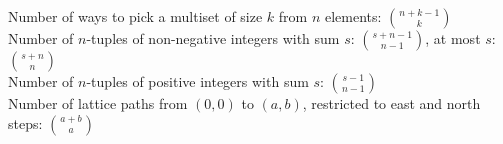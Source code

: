 \documentclass[12pt]{extarticle}
\begin{document}
\begin{multicols*}{2}
\iffalse
\begin{tabular}{r|rrrrrrrrrrrrr}
    & $0$ & $1$ & $2$ & $3$ & $4$ & $5$ & $6$ & $7$ & $8$ & $9$ & $10$ & $11$ & $12$ \\
    \hline
    $0$ & $1$\\
    $1$ & $1$ & $1$\\
    $2$ & $1$ & $2$ & $1$\\
    $3$ & $1$ & $3$ & $3$ & $1$\\
    $4$ & $1$ & $4$ & $6$ & $4$ & $1$\\
    $5$ & $1$ & $5$ & $10$ & $10$ & $5$ & $1$\\
    $6$ & $1$ & $6$ & $15$ & $20$ & $15$ & $6$ & $1$\\
    $7$ & $1$ & $7$ & $21$ & $35$ & $35$ & $21$ & $7$ & $1$\\
    $8$ & $1$ & $8$ & $28$ & $56$ & $70$ & $56$ & $28$ & $8$ & $1$\\
    $9$ & $1$ & $9$ & $36$ & $84$ & $126$ & $126$ & $84$ & $36$ & $9$ & $1$\\
    $10$ & $1$ & $10$ & $45$ & $120$ & $210$ & $252$ & $210$ & $120$ & $45$ & $10$ & $1$\\
    $11$ & $1$ & $11$ & $55$ & $165$ & $330$ & $462$ & $462$ & $330$ & $165$ & $55$ & $11$ & $1$\\
    $12$ & $1$ & $12$ & $66$ & $220$ & $495$ & $792$ & $924$ & $792$ & $495$ & $220$ & $66$ & $12$ & $1$ \\
    \hline
    & $0$ & $1$ & $2$ & $3$ & $4$ & $5$ & $6$ & $7$ & $8$ & $9$ & $10$ & $11$ & $12$
\end{tabular}
\fi

Number of ways to pick a multiset of size $k$ from $n$ elements: ${n+k-1 \choose k}$ \\
Number of $n$-tuples of non-negative integers with sum $s$:
${{s+n-1} \choose {n-1}}$, at most $s$: ${{s + n} \choose {n}}$ \\
Number of $n$-tuples of positive integers with sum $s$:
${{s-1} \choose {n-1}}$ \\
Number of lattice paths from $(0,0)$ to $(a,b)$, restricted to east and north
steps: ${a+b \choose a}$





\end{multicols*}
\end{document}
